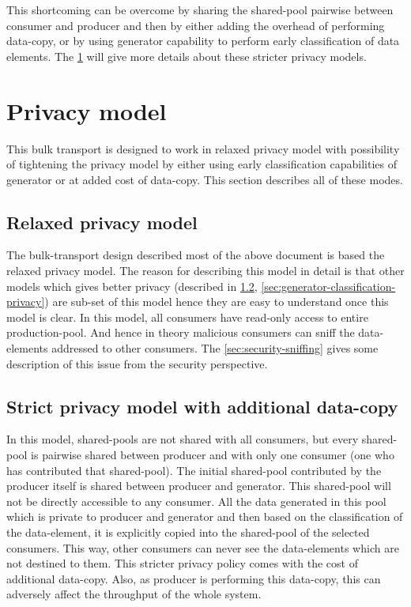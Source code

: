 \documentclass[a4paper,twoside]{report} %
\begin{document}
This shortcoming can be overcome by sharing the shared-pool pairwise
between consumer and producer and then by either adding the overhead 
of performing data-copy, or by using generator capability to perform 
early classification of data elements.  The \ref{sec:privacy} will 
give more details about these stricter privacy models.

\section{Privacy model}
\label{sec:privacy}
This bulk transport is designed to work in relaxed privacy model with
possibility of tightening the privacy model by either using early
classification capabilities of generator or at added cost of
data-copy.  This section describes all of these modes.

\subsection{Relaxed privacy model}
\label{sec:relaxed-privacy}
The bulk-transport design described most of the above document is 
based the relaxed privacy model.  The reason for describing this model
in detail is that other models which gives better privacy (described
in \ref{sec:data-copy-privacy},
\ref{sec:generator-classification-privacy}) are sub-set of this model 
hence they are easy to understand once this model is clear.  
In this model, all consumers have read-only access to entire 
production-pool.  And hence in theory malicious consumers can sniff the
data-elements addressed to other consumers.  The 
\ref{sec:security-sniffing} gives some description of this issue from
the security perspective.


\subsection{Strict privacy model with additional data-copy}
\label{sec:data-copy-privacy}
In this model, shared-pools are not shared with all consumers, but
every shared-pool is pairwise shared between producer and with only 
one consumer (one who has contributed that shared-pool).  The initial
shared-pool contributed by the producer itself is shared between
producer and generator.  This shared-pool will not be directly 
accessible to any consumer.  All the data generated in this pool which
is private to producer and generator and then based on the
classification of the data-element, it is explicitly copied into the
shared-pool of the selected consumers.  This way, other consumers can
never see the data-elements which are not destined to them.  This
stricter privacy policy comes with the cost of additional data-copy.
Also, as producer is performing this data-copy, this can adversely
affect the throughput of the whole system.
\end{document}
